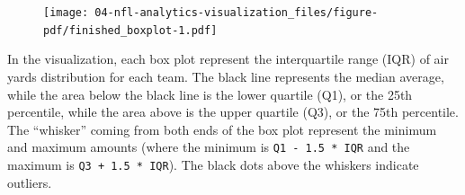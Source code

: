 \documentclass[
  letterpaper,
]{krantz}
\newenvironment{Shaded}{\begin{snugshade}}{\end{snugshade}}
\newcommand{\AttributeTok}[1]{\textcolor[rgb]{0.40,0.45,0.13}{#1}}
\newcommand{\FloatTok}[1]{\textcolor[rgb]{0.68,0.00,0.00}{#1}}
\newcommand{\FunctionTok}[1]{\textcolor[rgb]{0.28,0.35,0.67}{#1}}
\newcommand{\NormalTok}[1]{\textcolor[rgb]{0.00,0.23,0.31}{#1}}
\newcommand{\SpecialCharTok}[1]{\textcolor[rgb]{0.37,0.37,0.37}{#1}}
\newcommand{\StringTok}[1]{\textcolor[rgb]{0.13,0.47,0.30}{#1}}
\begin{document}
\begin{Shaded}
\end{Shaded}

\begin{figure}[H]

{\centering \texttt{[image: 04-nfl-analytics-visualization\_files/figure-pdf/finished\_boxplot-1.pdf]}

}

\end{figure}

In the visualization, each box plot represent the interquartile range
(IQR) of air yards distribution for each team. The black line represents
the median average, while the area below the black line is the lower
quartile (Q1), or the 25th percentile, while the area above is the upper
quartile (Q3), or the 75th percentile. The ``whisker'' coming from both
ends of the box plot represent the minimum and maximum amounts (where
the minimum is \texttt{Q1\ -\ 1.5\ *\ IQR} and the maximum is
\texttt{Q3\ +\ 1.5\ *\ IQR}). The black dots above the whiskers indicate
outliers.
\end{document}
